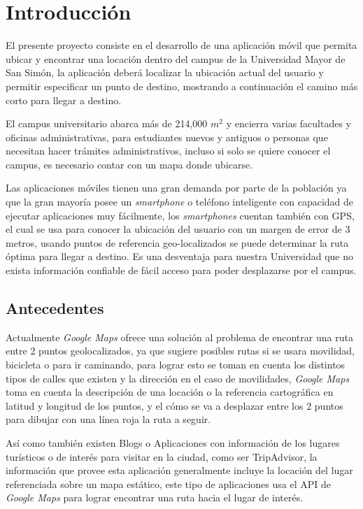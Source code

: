 \chapter{Introducción} %
\label{cha:introduccion}

El presente proyecto consiste en el desarrollo de una aplicación móvil que permita ubicar y encontrar una locación dentro del campus de la Universidad Mayor de San Simón, la aplicación deberá localizar la ubicación actual del usuario y permitir especificar un punto de destino, mostrando a continuación el camino más corto para llegar a destino.

El campus universitario abarca más de 214,000 $m^2$ y encierra varias facultades y oficinas administrativas, para estudiantes nuevos y antiguos o personas que
necesitan hacer trámites administrativos, incluso si solo se quiere conocer el
campus, es necesario contar con un mapa donde ubicarse.

Las aplicaciones móviles tienen una gran demanda por parte de la población ya
que la gran mayoría posee un \emph{smartphone} o teléfono inteligente con capacidad de
ejecutar aplicaciones muy fácilmente, los \emph{smartphones} cuentan también con GPS,
el cual se usa para conocer la ubicación del usuario con un margen de error de
3 metros, usando puntos de referencia geo-localizados se puede determinar la
ruta óptima para llegar a destino. Es una desventaja para nuestra Universidad que no exista información confiable de fácil acceso para poder desplazarse por el campus.

  \section{Antecedentes} %
  \label{sec:antecedentes}

  Actualmente \emph{Google Maps} ofrece una solución al problema de encontrar una ruta entre 2 puntos geolocalizados, ya que sugiere posibles rutas si se usara movilidad, bicicleta o para ir caminando, para lograr esto se toman en cuenta los distintos tipos de calles que existen y la dirección en el caso de movilidades, \emph{Google Maps} toma en cuenta la descripción de una locación o la referencia cartográfica en latitud y longitud de los puntos, y el cómo se va a desplazar entre los 2 puntos para dibujar con una línea roja la ruta a seguir.

  Así como también existen Blogs o Aplicaciones con información de los lugares turísticos o de interés para visitar en la ciudad, como ser TripAdvisor, la información que provee esta aplicación generalmente incluye la locación del lugar referenciada sobre un mapa estático, este tipo de aplicaciones usa el API de \emph{Google Maps} para lograr encontrar una ruta hacia el lugar de interés.

